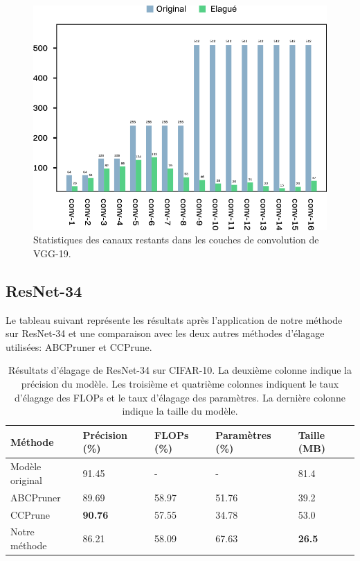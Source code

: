 \begin{figure}[hbt!]
  \centering
  \includegraphics[width=14cm]{images_pfe/vgg-channels.png}
  \caption{Statistiques des canaux restants dans les couches de convolution de VGG-19.}
  \label{fig:vgg-channels}
\end{figure}
\FloatBarrier
\medskip

\subsection{ResNet-34}
Le tableau suivant représente les résultats après l'application de notre méthode sur ResNet-34 et une comparaison avec les deux autres méthodes d'élagage utilisées: ABCPruner et CCPrune.

\begin{table}[h!]
\begin{tabular}{|p{3.25cm}|p{3cm}|p{2.25cm}|p{3cm}|p{2.25cm}|}
\hline
Méthode & Précision (\%) & FLOPs (\%) & Paramètres (\%) & Taille (MB) \\
\hline
Modèle original & 91.45 & - & - & 81.4 \\
\hline
ABCPruner & 89.69 & 58.97 & 51.76 & 39.2 \\
\hline
CCPrune & \textbf{90.76} & 57.55 & 34.78 & 53.0 \\
\hline
Notre méthode & 86.21 & 58.09 & 67.63 & \textbf{26.5} \\
\hline
\end{tabular}
\caption{Résultats d'élagage de ResNet-34 sur CIFAR-10. La deuxième colonne indique la précision du modèle. Les troisième et quatrième colonnes indiquent le taux d'élagage des FLOPs et le taux d'élagage des paramètres. La dernière colonne indique la taille du modèle.}
\label{table:resnet-pruning-results}
\end{table}

